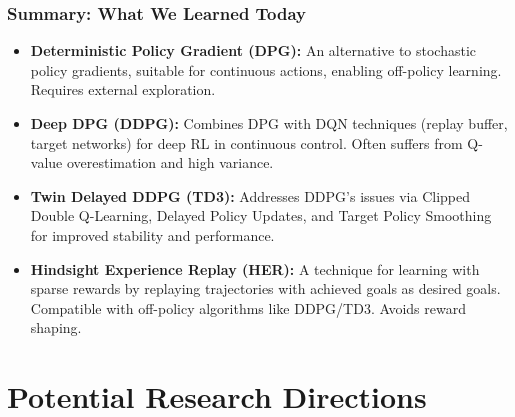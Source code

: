 \documentclass[9pt, aspectratio=169]{beamer}
\begin{document}
\begin{frame}
  \frametitle{Summary: What We Learned Today}
    \begin{itemize}
        \item \textbf{Deterministic Policy Gradient (DPG):} An alternative to stochastic policy gradients, suitable for continuous actions, enabling off-policy learning. Requires external exploration.

        \item \textbf{Deep DPG (DDPG):} Combines DPG with DQN techniques (replay buffer, target networks) for deep RL in continuous control. Often suffers from Q-value overestimation and high variance.

        \item \textbf{Twin Delayed DDPG (TD3):} Addresses DDPG's issues via Clipped Double Q-Learning, Delayed Policy Updates, and Target Policy Smoothing for improved stability and performance.
        \item \textbf{Hindsight Experience Replay (HER):} A technique for learning with sparse rewards by replaying trajectories with achieved goals as desired goals. Compatible with off-policy algorithms like DDPG/TD3. Avoids reward shaping.
    \end{itemize}
\end{frame}


\section{Potential Research Directions}
\end{document}
